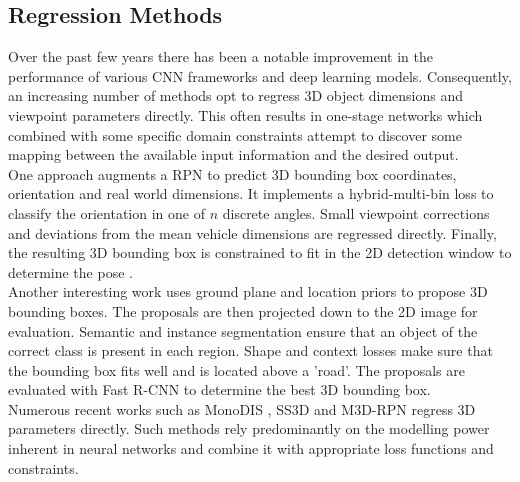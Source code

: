 \documentclass[main.tex]{subfiles}
\begin{document}
\subsection{Regression Methods}
\indent Over the past few years there has been a notable improvement in the performance of various CNN frameworks and deep learning models. Consequently, an increasing number of methods opt to regress 3D object dimensions and viewpoint parameters directly. This often results in one-stage networks which combined with some specific domain constraints attempt to discover some mapping between the available input information and the desired output.\\
\indent One approach augments a RPN to predict 3D bounding box coordinates, orientation and real world dimensions. It implements a hybrid-multi-bin loss to classify the orientation in one of $n$ discrete angles. Small viewpoint corrections and deviations from the mean vehicle dimensions are regressed directly. Finally, the resulting 3D bounding box is constrained to fit in the 2D detection window to determine the pose \cite{Mousavian2017a}.\\
\indent Another interesting work uses ground plane and location priors to propose 3D bounding boxes. The proposals are then projected down to the 2D image for evaluation. Semantic and instance segmentation ensure that an object of the correct class is present in each region. Shape and context losses make sure that the bounding box fits well and is located above a 'road'. The proposals are evaluated with Fast R-CNN to determine the best 3D bounding box.\\
\indent Numerous recent works such as MonoDIS \cite{Simonelli2019a}, SS3D \cite{Jorgensen2019} and M3D-RPN \cite{Brazil2019} regress 3D parameters directly. Such methods rely predominantly on the modelling power inherent in neural networks and combine it with appropriate loss functions and constraints.
\end{document}
